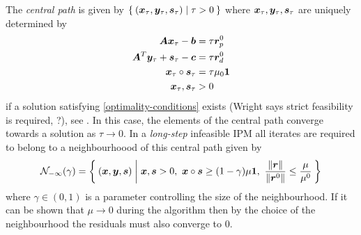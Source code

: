 The \emph{central path} is given by \(\Set{(\bm{x}_\tau, \bm{y}_\tau, \bm{s}_\tau) | \tau > 0}\) where \(\bm{x}_\tau, \bm{y}_\tau, \bm{s}_\tau\) are uniquely determined by
\begin{subequations}
  \begin{align}
    \bm{A}\bm{x}_\tau - \bm{b} &= \tau \bm{r}_p^0 \\
    \bm{A}^T \bm{y}_\tau + \bm{s}_\tau - \bm{c} &= \tau \bm{r}_d^0 \\
    \bm{x}_\tau \circ \bm{s}_\tau &= \tau \mu_0 \bm{1} \\
    \bm{x}_\tau, \bm{s}_\tau &> 0
  \end{align}
\end{subequations}
if a solution satisfying \cref{optimality-conditions} exists (Wright says strict feasibility is required, ?), see \cite{Mizuno-PolynomialTimeConvergenceInexactIPM}.
In this case, the elements of the central path converge towards a solution as \(\tau \to 0\).
In a \emph{long-step} infeasible IPM all iterates are required to belong to a neighbourhoood of this central path given by
\begin{equation}
  \mathcal{N}_{-\infty}(\gamma) = \Set{ (\bm{x}, \bm{y}, \bm{s}) | \bm{x}, \bm{s} > 0, \ \bm{x} \circ \bm{s} \geq (1 - \gamma) \mu \bm{1}, \ \frac{\lVert \bm{r} \rVert}{\lVert \bm{r}^0 \rVert} \leq \frac{\mu}{\mu^0} }
\end{equation}
where \(\gamma \in (0, 1)\) is a parameter controlling the size of the neighbourhood.
If it can be shown that \(\mu \to 0\) during the algorithm then by the choice of the neighbourhood the residuals must also converge to \(0\).

